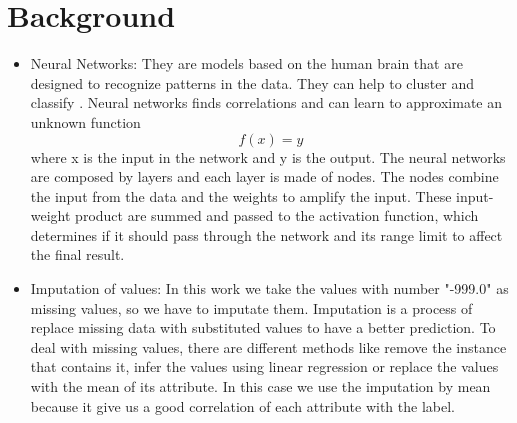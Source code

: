 \documentclass[conference]{IEEEtran}
\begin{document}
\section{Background}
\begin{itemize}
\item Neural Networks: They are models based on the human brain that are designed to recognize patterns in the data. They can help to cluster and classify \cite{b3}. Neural networks finds correlations and can learn to approximate an unknown function \begin{equation}f(x)=y\end{equation} where x is the input in the network and y is the output. The neural networks are composed by layers and each layer is made of nodes. The nodes combine the input from the data and the weights to amplify the input. These input-weight product are summed and passed to the activation function, which determines if it should pass through the network and its range limit to affect the final result.\newline
\item  Imputation of values: In this work we take the values with number "-999.0" as missing values, so we have to imputate them. Imputation is a process of replace missing data with substituted values to have a better prediction. To deal with missing values, there are different methods like remove the instance that contains it, infer the values using linear regression or replace the values with the mean of its attribute. In this case we use the imputation by mean because it give us a good correlation of each attribute with the label.
\end{itemize}
\end{document}

